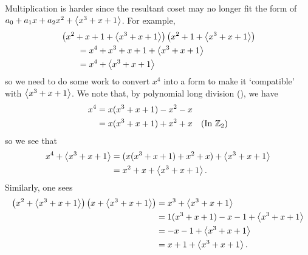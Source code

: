 \begin{example}
    Multiplication is harder since the resultant coset may no longer fit the form of $a_0 + a_1x + a_2x^2 + \left\langle x^3+x+1\right\rangle$. For example,
    \begin{align*}
        &\left(x^2 + x + 1 + \left\langle x^3 + x + 1\right\rangle\right)\left(x^2 + 1 + \left\langle x^3 + x + 1\right\rangle\right)\\
        &\quad\quad= x^4+x^3+x+1 + \left\langle x^3 + x + 1\right\rangle\\
        &\quad\quad= x^4 + \left\langle x^3 + x + 1\right\rangle
    \end{align*}
    so we need to do some work to convert $x^4$ into a form to make it `compatible' with $\left\langle x^3 + x + 1\right\rangle$. We note that, by polynomial long division (), we have
    \begin{align*}
        x^4 &= x(x^3+x+1) - x^2 - x\\
        &= x(x^3+x+1) + x^2 + x & (\text{In } \mathbb{Z}_2)
    \end{align*}
    so we see that
    \begin{align*}
        x^4 + \left\langle x^3 + x + 1\right\rangle &= (x(x^3+x+1) + x^2 + x) + \left\langle x^3 + x + 1\right\rangle\\
        &= x^2 + x + \left\langle x^3 + x + 1\right\rangle.
    \end{align*}
    Similarly, one sees
    \begin{align*}
        \left(x^2 + \left\langle x^3 + x + 1\right\rangle\right)\left(x + \left\langle x^3 + x + 1\right\rangle\right) &= x^3 + \left\langle x^3 + x + 1\right\rangle\\
        &= 1(x^3+x+1) - x - 1 + \left\langle x^3 + x + 1\right\rangle\\
        &= -x - 1 + \left\langle x^3 + x + 1\right\rangle\\
        &= x + 1 + \left\langle x^3 + x + 1\right\rangle.
    \end{align*}
\end{example}

